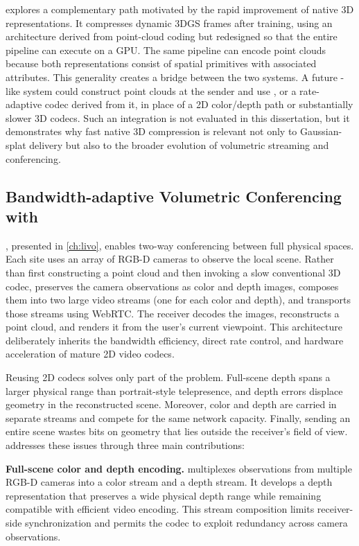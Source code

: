 \gsnfs explores a complementary path motivated by the rapid improvement of native 3D representations. 
%
It compresses dynamic 3DGS frames after training, using an architecture derived from point-cloud coding but redesigned so that the entire pipeline can execute on a GPU. 
%
The same pipeline can encode point clouds because both representations consist of spatial primitives with associated attributes. 
%
This generality creates a bridge between the two systems. 
%
A future \livo-like system could construct point clouds at the sender and use \gsnfs, or a rate-adaptive codec derived from it, in place of a 2D color/depth path or substantially slower 3D codecs. 
%
Such an integration is not evaluated in this dissertation, but it demonstrates why fast native 3D compression is relevant not only to Gaussian-splat delivery but also to the broader evolution of volumetric streaming and conferencing.

\subsection{Bandwidth-adaptive Volumetric Conferencing with \livo}
\label{sec:intro_v2_livo}

\livo, presented in \cref{ch:livo}, enables two-way conferencing between full physical spaces. 
%
Each site uses an array of RGB-D cameras to observe the local scene. 
%
Rather than first constructing a point cloud and then invoking a slow conventional 3D codec, \livo preserves the camera observations as color and depth images, composes them into two large video streams (one for each color and depth), and transports those streams using WebRTC. 
%
The receiver decodes the images, reconstructs a point cloud, and renders it from the user's current viewpoint. 
%
This architecture deliberately inherits the bandwidth efficiency, direct rate control, and hardware acceleration of mature 2D video codecs.

Reusing 2D codecs solves only part of the problem. 
%
Full-scene depth spans a larger physical range than portrait-style telepresence, and depth errors displace geometry in the reconstructed scene. 
%
Moreover, color and depth are carried in separate streams and compete for the same network capacity. 
%
Finally, sending an entire scene wastes bits on geometry that lies outside the receiver's field of view. 
%
\livo addresses these issues through three main contributions:

\squishlist
    \item \textbf{Full-scene color and depth encoding.} \livo multiplexes observations from multiple RGB-D cameras into a color stream and a depth stream. It develops a depth representation that preserves a wide physical depth range while remaining compatible with efficient video encoding. This stream composition limits receiver-side synchronization and permits the codec to exploit redundancy across camera observations.

